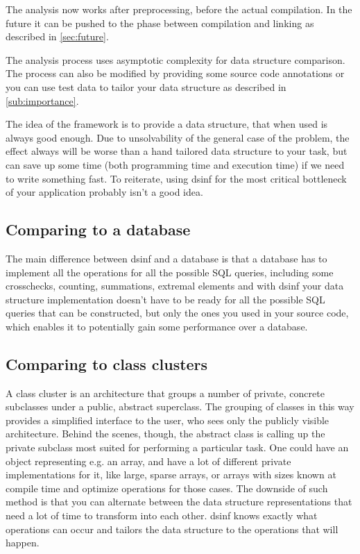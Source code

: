 \documentclass[a4paper,11pt]{article}
\begin{document}
		The analysis now works after preprocessing, before the actual compilation. In the future it can be
		pushed to the phase between compilation and linking as described in \autoref{sec:future}.

		The analysis process uses asymptotic complexity for data structure comparison. The process can also be
		modified by providing some source code annotations or you can use test data to tailor your data
		structure as described in \autoref{sub:importance}.

		The idea of the framework is to provide a data structure, that when used is always good enough. Due to
		unsolvability of the general case of the problem, the effect always will be worse than a hand tailored
		data structure to your task, but can save up some time (both programming time and execution time) if we
		need to write something fast. To reiterate, using dsinf for the most critical bottleneck of your
		application probably isn't a good idea.

	\subsection{Comparing to a database} \label{sub:database}
		The main difference between dsinf and a database is that a database has to implement all the operations
		for all the possible SQL queries, including some crosschecks, counting, summations, extremal elements
		and with dsinf your data structure implementation doesn't have to be ready for all the possible SQL
		queries that can be constructed, but only the ones you used in your source code, which enables it to
		potentially gain some performance over a database.

	\subsection{Comparing to class clusters} \label{sub:classcluster}
		A class cluster is an architecture that groups a number of private, concrete subclasses under a public,
		abstract superclass. The grouping of classes in this way provides a simplified interface to the user,
		who sees only the publicly visible architecture. Behind the scenes, though, the abstract class is
		calling up the private subclass most suited for performing a particular task\cite{AppleCC}. One could
		have an object representing e.g. an array, and have a lot of different private implementations for it, like
		large, sparse arrays, or arrays with sizes known at compile time and optimize operations for those
		cases. The downside of such method is that you can alternate between the data structure representations
		that need a lot of time to transform into each other. dsinf knows exactly what operations can occur and
		tailors the data structure to the operations that will happen.
\end{document}
